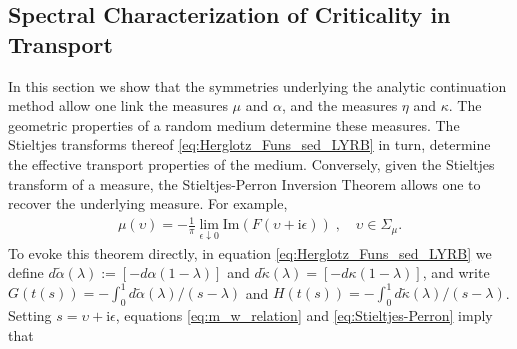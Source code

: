 \documentclass[english,12pt,jmp,graphicx]{revtex4-1}
\newcommand{\I}{\mathrm{i}}
\begin{document}
\subsection{Spectral Characterization of Criticality in
  Transport} \label{sec:Measure_Equivalences}   
%
In this section we show that the symmetries underlying the
analytic continuation method allow one link the measures $\mu$ and $\alpha$,
and the measures $\eta$ and $\kappa$. The geometric properties of a random
medium determine these measures. The Stieltjes transforms thereof
\eqref{eq:Herglotz_Funs_sed_LYRB} in turn, 
determine the effective transport properties of the
medium. Conversely, given the Stieltjes transform of a measure, the
Stieltjes-Perron Inversion Theorem
\cite{Day:JPCM-96,Henrici:1974:v3,MILTON:2002:TC} allows one to
recover the underlying measure. For example,  
%
\begin{align}\label{eq:Stieltjes-Perron}
  \mu(\upsilon)=-\frac{1}{\pi}\lim_{\epsilon\downarrow0}\text{Im}(F(\upsilon+\I\epsilon))\;, \quad
  \upsilon\in\Sigma_\mu. 
\end{align}
%
To evoke this theorem directly, in equation
\eqref{eq:Herglotz_Funs_sed_LYRB} we define 
$d\tilde{\alpha}(\lambda):=[-d\alpha(1-\lambda)]$ and $d\tilde{\kappa}(\lambda)=[-d\kappa(1-\lambda)]$, and write
$G(t(s))=-\int_0^1d\tilde{\alpha}(\lambda)/(s-\lambda)$ and
$H(t(s))=-\int_0^1d\tilde{\kappa}(\lambda)/(s-\lambda)$. Setting $s=\upsilon+\I\epsilon$,
equations \eqref{eq:m_w_relation} and \eqref{eq:Stieltjes-Perron}
imply that  
\end{document}
